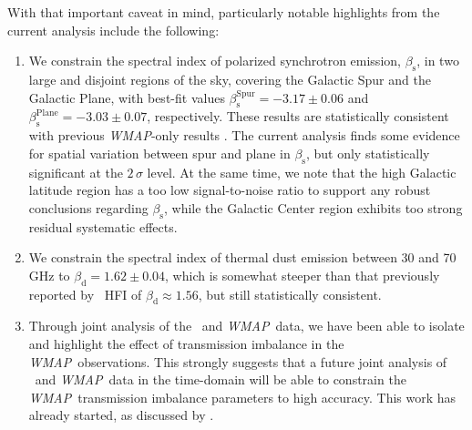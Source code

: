\documentclass[twocolumn]{aa}
\def\WMAP{\textit{WMAP}}
\newcommand{\?}[1]{\textcolor{red}{{\bf [#1]}}}
\begin{document}
With that important caveat in mind, particularly notable highlights
from the current analysis include the following:
\begin{enumerate}
\item We constrain the spectral index of polarized synchrotron emission,
  $\beta_{\mathrm{s}}$, in two large and disjoint regions of the sky, covering
  the Galactic Spur and the Galactic Plane, with best-fit values $\beta_{\mathrm
  s}^{\mathrm{Spur}}=-3.17\pm 0.06$ and $\beta_{\mathrm
  s}^{\mathrm{Plane}}=-3.03\pm 0.07$, respectively. These results are
  statistically consistent with previous \WMAP-only results \citep{dunkley2009b}.
  The current analysis finds some evidence for spatial variation between spur
  and plane in $\beta_{\mathrm{s}}$, but only statistically significant at the
  $2\,\sigma$ level. At the same time, we note that the high Galactic latitude
  region has a too low signal-to-noise ratio to support any robust conclusions
  regarding $\beta_{\mathrm{s}}$, while the Galactic Center region exhibits too
  strong residual systematic effects.
\item We constrain the spectral index of thermal dust emission between
  30 and 70\,GHz to $\beta_{\mathrm d}=1.62\pm 0.04$, which is somewhat steeper
  than that previously reported by \Planck\ HFI \citep{planck2016-l04,
    planck2020-LVII} of $\beta_{\mathrm{d}}\approx 1.56$, but still
  statistically consistent. 
\item Through joint analysis of the \Planck\ and \WMAP\ data, we have
  been able to isolate and highlight the effect of transmission
  imbalance in the \WMAP\ observations. This strongly suggests that a
  future joint analysis of \Planck\ and \WMAP\ data in the time-domain
  will be able to constrain the \WMAP\ transmission imbalance
  parameters to high accuracy. This work has already started, as
  discussed by \citet{bp17}.
\end{enumerate}
\end{document}
